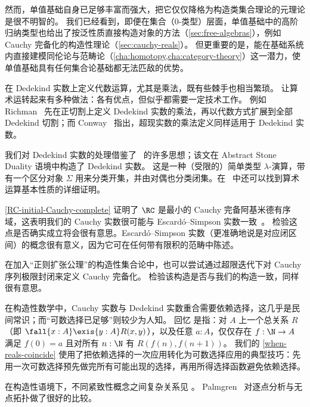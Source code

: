 然而，单值基础自身已足够丰富而强大，把它仅仅降格为构造类集合理论的元理论是很不明智的。
我们已经看到，即便在集合（0-类型）层面，单值基础中的高阶归纳类型也给出了按泛性质直接构造对象的方法（\cref{sec:free-algebras}），例如 Cauchy 完备化的构造性理论（\cref{sec:cauchy-reals}）。
但更重要的是，能在基础系统内直接建模同伦论与范畴论（\cref{cha:homotopy,cha:category-theory}）这一潜力，使单值基础具有任何集合论基础都无法匹敌的优势。
%

%

\sectionNotes

在 Dedekind 实数上定义代数运算，尤其是乘法，既有些棘手也相当繁琐。
让算术运转起来有多种做法：各有优点，但似乎都需要一定技术工作。
例如 Richman~\cite{Richman:reals} 先在正切割上定义 Dedekind 实数的乘法，再以代数方式扩展到全部 Dedekind 切割；而 Conway~\cite{conway:onag} 指出，超现实数的乘法定义同样适用于 Dedekind 实数。

我们对 Dedekind 实数的处理借鉴了~\cite{BauerTaylor09} 的许多思想；该文在 Abstract Stone Duality 语境中构造了 Dedekind 实数。
%
这是一种（受限的）简单类型 $\lambda$-演算，带有一个区分对象 $\Sigma$ 用来分类开集，并由对偶也分类闭集。在~\cite{BauerTaylor09} 中还可以找到算术运算基本性质的详细证明。

\cref{RC-initial-Cauchy-complete} 证明了 $\RC$ 是最小的 Cauchy 完备阿基米德有序域，这表明我们的 Cauchy 实数很可能与 Escard{\'o}--Simpson 实数一致~\cite{EscardoSimpson:01}。
%
检验这点是否确实成立将会很有意思。Escard{\'o}--Simpson 实数（更准确地说是对应闭区间）的概念很有意义，因为它可在任何带有限积的范畴中陈述。

在加入“正则扩张公理”的构造性集合论中，也可以尝试通过超限迭代下对 Cauchy 序列极限封闭来定义 Cauchy 完备化。
检验该构造是否与我们的构造一致，同样很有意思。

在构造性数学中，Cauchy 实数与 Dedekind 实数重合需要依赖选择，这几乎是民间常识；而“可数选择已足够”则较少为人知。
回忆
%
%
%
是指：对 $A$ 上一个总关系 $R$（即 $\fall{x : A} \exis{y : A} R(x,y)$），以及任意 $a : A$，仅仅存在 $f : \N \to A$ 满足 $f(0) = a$ 且对所有 $n : \N$ 有 $R(f(n), f(n+1))$。
我们的 \cref{when-reals-coincide} 使用了把依赖选择的一次应用转化为可数选择应用的典型技巧：先用一次可数选择预先做完所有可能出现的选择，再用所得选择函数避免依赖选择。

在构造性语境下，不同紧致性概念之间复杂关系见 \cite{bridges2002compactness}。
Palmgren~\cite{Palmgren:FT} 对逐点分析与无点拓扑做了很好的比较。

